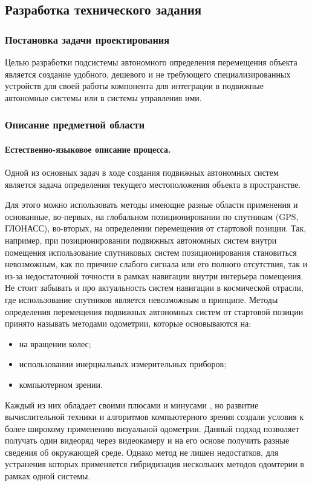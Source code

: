 \subsection{Разработка технического задания}
\subsubsection{Постановка задачи проектирования}

Целью разработки подсистемы автономного определения перемещения объекта является создание удобного, дешевого и не требующего специализированных устройств для своей работы компонента для интеграции в подвижные автономные системы или в системы управления ими.


\subsubsection{Описание предметной области}
\paragraph{Естественно-языковое описание процесса.}

Одной из основных задач в ходе создания подвижных автономных систем является задача определения текущего местоположения объекта в пространстве.

Для этого можно использовать методы имеющие разные области применения и основанные, во-первых, на глобальном позиционировании по спутникам (GPS, ГЛОНАСС), во-вторых, на определении перемещения от стартовой позиции. Так, например, при позиционировании подвижных автономных систем внутри помещения использование спутниковых систем позиционирования становиться невозможным, как по причине слабого сигнала или его полного отсутствия, так и из-за недостаточной точности в рамках навигации внутри интерьера помещения. Не стоит забывать и про актуальность систем навигации в космической отрасли, где использование спутников является невозможным в принципе. Методы определения перемещения подвижных автономных систем от стартовой позиции принято называть методами одометрии, которые основываются на:
\begin{itemize}
\item на вращении колес;
\item использовании инерциальных измерительных приборов;
\item компьютерном зрении.
\end{itemize}

Каждый из них обладает своими плюсами и минусами \cite{odometryMethods}, но развитие вычислительной техники и алгоритмов компьютерного зрения создали условия к более широкому применению визуальной одометрии. Данный подход позволяет получать один видеоряд через видеокамеру и на его основе получить разные сведения об окружающей среде. Однако метод не лишен недостатков, для устранения которых применяется гибридизация нескольких методов одомтерии в рамках одной системы.

